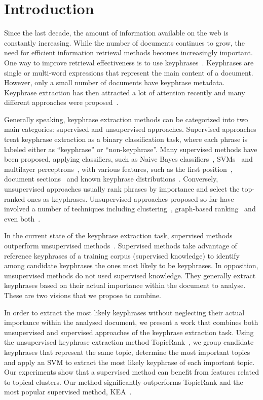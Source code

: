 \section{Introduction}
\label{sec:introduction}
  Since the last decade, the amount of information available on the web is
  constantly increasing. While the number of documents continues to grow, the
  need for efficient information retrieval methods becomes increasingly
  important. One way to improve retrieval effectiveness is to use
  keyphrases~\cite{jones1999phrasier}. Keyphrases are single or multi-word
  expressions that represent the main content of a document. However,
  only a small number of documents have keyphrase metadata. Keyphrase extraction
  has then attracted a lot of attention recently and many different approaches
  were proposed~\cite{hasan2014state_of_the_art}.

  Generally speaking, keyphrase extraction methods can be categorized into two
  main categories: supervised and unsupervised approaches. Supervised approaches
  treat keyphrase extraction as a binary classification task, where each phrase
  is labeled either as ``keyphrase'' or ``non-keyphrase''. Many supervised
  methods have been proposed, applying classifiers, such as Naive Bayes
  classifiers~\cite{witten1999kea}, SVMs~\cite{zhang2006svm} and multilayer
  perceptrons~\cite{sarkar2010neuralnetwork}, with various features, such as the
  first position~\cite{witten1999kea}, document
  sections~\cite{nguyen2007keadocumentstructure} and known keyphrase
  distributions~\cite{frank1999keafrequency}. Conversely, unsupervised
  approaches usually rank phrases by importance and select the top-ranked ones
  as keyphrases. Unsupervised approaches proposed so far have involved a number
  of techniques including clustering~\cite{matsuo2004wordcooccurrence},
  graph-based ranking~\cite{mihalcea2004textrank} and even
  both~\cite{bougouin2013topicrank}.

  In the current state of the keyphrase extraction task, supervised methods
  outperform unsupervised methods~\cite{kim2010semeval}. Supervised methods take
  advantage of reference keyphrases of a training corpus (supervised knowledge)
  to identify among candidate keyphrases the ones most likely to be keyphrases.
  In opposition, unsupervised methods do not used supervised knowledge. They
  generally extract keyphrases based on their actual importance within the
  document to analyse. These are two visions that we propose to combine.

  In order to extract the most likely keyphrases without neglecting their actual
  importance within the analysed document, we present a work that combines both
  unsupervised and supervised approaches of the keyphrase extraction task. Using
  the unsupervised keyphrase extraction method
  Topic\-Rank~\cite{bougouin2013topicrank}, we group candidate keyphrases that
  represent the same topic, determine the most important topics and apply an SVM
  to extract the most likely keyphrase of each important topic. Our experiments
  show that a supervised method can benefit from features related to topical
  clusters. Our method significantly outperforms TopicRank and the most popular
  supervised method, KEA~\cite{witten1999kea}.

